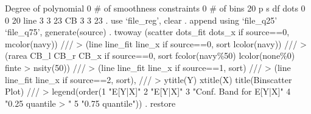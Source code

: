          Degree of polynomial {\VBAR}       0
  \# of smoothness constraints {\VBAR}       0
                    \# of bins {\VBAR}      20
{\smallskip}
         {\VBAR}      p       s       df
 dots    {\VBAR}      0       0       20
 line    {\VBAR}      3       3       23
 CB      {\VBAR}      3       3       23
{\smallskip}
. use `file_reg', clear
{\smallskip}
. append using `file_q25' `file_q75', generate(source)
{\smallskip}
. twoway (scatter dots_fit dots_x if source==0, mcolor(navy)) ///
>        (line line_fit line_x if source==0, sort lcolor(navy)) ///
>            (rarea CB_l CB_r CB_x if source==0, sort fcolor(navy\%50) lcolor(none\%0) finte
> nsity(50)) ///
>            (line line_fit line_x if source==1, sort) ///
>            (line line_fit line_x if source==2, sort), ///
>            ytitle(Y) xtitle(X) title(Binscatter Plot) ///
>            legend(order(1 "E[Y|X]" 2 "E[Y|X]" 3 "Conf. Band for E[Y|X]" 4 "0.25 quantile
> " 5 "0.75 quantile"))
{\smallskip}
. restore
{\smallskip}
